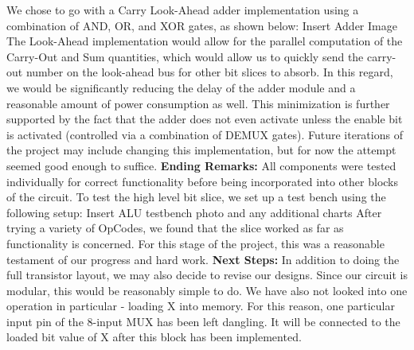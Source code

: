 \documentclass[12pt]{article}
\begin{document}
	We chose to go with a Carry Look-Ahead adder implementation using a combination of AND,
	OR, and XOR gates, as shown below:
	\newline \newline
	Insert Adder Image
	\newline \newline
	The Look-Ahead implementation would allow for the parallel computation of the Carry-Out and
	Sum quantities, which would allow us to quickly send the carry-out number on the look-ahead
	bus for other bit slices to absorb. In this regard, we would be significantly reducing the delay
	of the adder module and a reasonable amount of power consumption as well. This minimization
	is further supported by the fact that the adder does not even activate unless the enable bit
	is activated (controlled via a combination of DEMUX gates). Future iterations of the project 
	may include changing this implementation, but for now the attempt seemed good enough to
	suffice.
	\newline \newline
	\textbf{Ending Remarks:}
	\newline \newline
	All components were tested individually for correct functionality before being incorporated 
	into other blocks of the circuit. To test the high level bit slice, we set up a test bench using
	the following setup:
	\newline \newline
	Insert ALU testbench photo and any additional charts
	\newline \newline
	After trying a variety of OpCodes, we found that the slice worked as far as functionality 
	is concerned. For this stage of the project, this was a reasonable testament of our progress
	and hard work.
	\newline \newline
	\textbf{Next Steps:}
	\newline \newline
	In addition to doing the full transistor layout, we may also decide to revise our designs. Since
	our circuit is modular, this would be reasonably simple to do. We have also not looked into
	one operation in particular - loading X into memory. For this reason, one particular input pin 
	of the 8-input MUX has been left dangling. It will be connected to the loaded bit value of
	X after this block has been implemented. 
\end{document}
